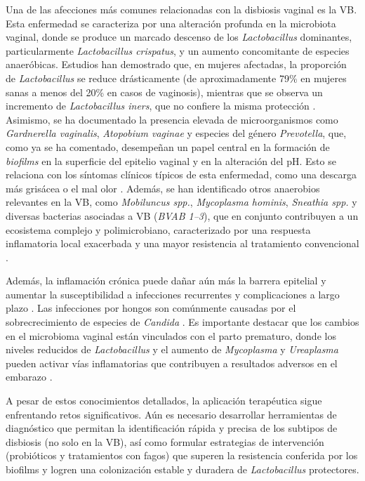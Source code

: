 Una de las afecciones más comunes relacionadas con la disbiosis vaginal es la VB. Esta enfermedad se caracteriza por una alteración profunda en la microbiota vaginal, donde se produce un marcado descenso de los \textit{Lactobacillus} dominantes, particularmente \textit{Lactobacillus crispatus}, y un aumento concomitante de especies anaeróbicas. Estudios han demostrado que, en mujeres afectadas, la proporción de \textit{Lactobacillus} se reduce drásticamente (de aproximadamente 79\% en mujeres sanas a menos del 20\% en casos de vaginosis), mientras que se observa un incremento de \textit{Lactobacillus iners}, que no confiere la misma protección \cite{chen2021female, ceccarani2019diversity}. Asimismo, se ha documentado la presencia elevada de microorganismos como \textit{Gardnerella vaginalis}, \textit{Atopobium vaginae} y especies del género \textit{Prevotella}, que, como ya se ha comentado, desempeñan un papel central en la formación de \textit{biofilms} en la superficie del epitelio vaginal y en la alteración del pH. Esto se relaciona con los síntomas clínicos típicos de esta enfermedad, como una descarga más grisácea o el mal olor \cite{abou2022bacterial, vitali2015vaginal}. Además, se han identificado otros anaerobios relevantes en la VB, como \textit{Mobiluncus spp.}, \textit{Mycoplasma hominis}, \textit{Sneathia spp.} y diversas bacterias asociadas a VB (\textit{BVAB 1–3}), que en conjunto contribuyen a un ecosistema complejo y polimicrobiano, caracterizado por una respuesta inflamatoria local exacerbada y una mayor resistencia al tratamiento convencional \cite{onderdonk2016human, martin2016vaginal}.

Además, la inflamación crónica puede dañar aún más la barrera epitelial y aumentar la susceptibilidad a infecciones recurrentes y complicaciones a largo plazo \cite{chen2021female, lev2022vaginal}. Las infecciones por hongos son comúnmente causadas por el sobrecrecimiento de especies de \textit{Candida} \cite{sobel2007vulvovaginal}. Es importante destacar que los cambios en el microbioma vaginal están vinculados con el parto prematuro, donde los niveles reducidos de \textit{Lactobacillus} y el aumento de \textit{Mycoplasma} y \textit{Ureaplasma} pueden activar vías inflamatorias que contribuyen a resultados adversos en el embarazo \cite{gudnadottir2022vaginal}.


A pesar de estos conocimientos detallados, la aplicación terapéutica sigue enfrentando retos significativos. Aún es necesario desarrollar herramientas de diagnóstico que permitan la identificación rápida y precisa de los subtipos de disbiosis (no solo en la VB), así como formular estrategias de intervención (probióticos y tratamientos con fagos) que superen la resistencia conferida por los biofilms y logren una colonización estable y duradera de \textit{Lactobacillus} protectores.

